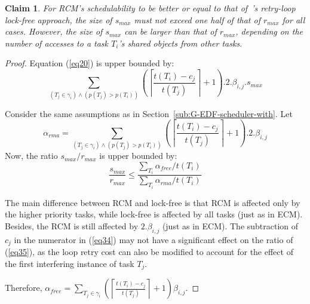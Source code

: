\documentclass[a4paper,english]{article}
\newtheorem{clm}{Claim}
\newtheorem{proof}{Proof}
\begin{document}
\begin{clm}
For RCM's schedulability to be better or equal to that of~\cite{key-5}'s retry-loop lock-free approach, the size of $s_{max}$ must not exceed one half of that of $r_{max}$ for all cases.
However, the size of $s_{max}$ can be larger than that of $r_{max}$, depending on the number of accesses to a task $T_i$'s shared objects from other tasks.
\end{clm}
\begin{proof}\normalfont
Equation (\ref{eq20}) is upper bounded by:
 \begin{equation}
\sum_{\left(T_{j}\in\gamma_{i}\right)\wedge\left(p\left(T_{j}\right)> p\left(T_{i}\right)\right)}\left(\left\lceil\frac{t\left(T_{i}\right)-c_{j}}{t\left(T_{j}\right)}\right\rceil+1\right).2.\beta_{i,j}.s_{max}
\label{eq34}\end{equation}

Consider the same assumptions as in Section~\ref{sub:G-EDF-scheduler-with}.
Let \[\alpha_{rma}=\sum_{\left(T_{j}\in\gamma_{i}\right)\wedge\left(p\left(T_{j}\right)> p\left(T_{i}\right)\right)}\left(\left\lceil\frac{t\left(T_{i}\right)-c_{j}}{t\left(T_{j}\right)}\right\rceil+1\right).2.\beta_{i,j}\]Now, the ratio $s_{max}/r_{max}$ is upper bounded by:
\begin{equation}
\frac{s_{max}}{r_{max}}\le\frac{\sum_{T_{i}}\alpha_{free}/t\left(T_{i}\right)}{\sum_{T_{i}}\alpha_{rma}/t\left(T_{i}\right)}
\label{eq35}\end{equation}

The main difference between RCM and lock-free is that RCM is affected only by the higher priority tasks, while lock-free is affected by all tasks (just as in ECM). 
Besides, the RCM
is still affected by $2.\beta_{i,j}$ (just as in ECM).
The subtraction of $c_{j}$ in the numerator in (\ref{eq34}) may not
have a significant effect on the ratio of (\ref{eq35}), as the loop retry 
cost can also be modified to account for the effect of the first interfering
instance of task $T_{j}$. 


Therefore, 
$\alpha_{free} = \sum_{T_{j}\in\gamma_{i}}\left(\left\lceil\frac{t\left(T_{i}\right)-c_j}{t\left(T_{j}\right)}\right\rceil + 1 \right)\beta_{i,j}$.


\end{proof}
\end{document}
